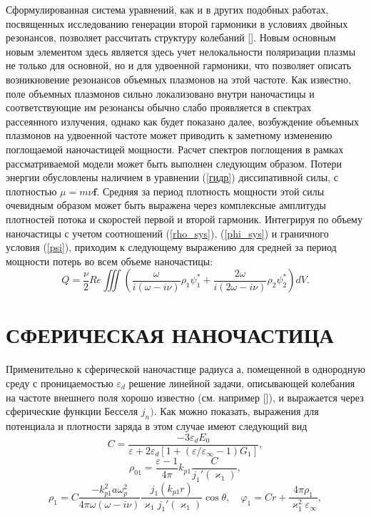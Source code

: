 \documentclass[12pt, a4paper]{article}
\renewcommand{\vec}{\mathbf}
\def \eps {\varepsilon}
\def \w {\omega}
\def \ph {\varphi}
\def \kp { \varkappa}
\begin{document}
Сформулированная система уравнений, как и в других подобных работах, посвященных исследованию генерации второй гармоники в условиях двойных резонансов, позволяет рассчитать структуру колебаний []. Новым основным новым элементом здесь является здесь учет нелокальности поляризации плазмы не только для основной, но и для удвоенной гармоники, что позволяет описать возникновение резонансов объемных плазмонов на этой частоте. Как известно, поле объемных плазмонов сильно локализовано внутри наночастицы и соответствующие им резонансы обычно слабо проявляется в спектрах рассеянного излучения, однако как будет показано далее, возбуждение объемных плазмонов на удвоенной частоте может приводить к заметному изменению поглощаемой наночастицей мощности. Расчет спектров поглощения в рамках рассматриваемой модели может быть выполнен следующим образом. Потери энергии обусловлены наличием в уравнении (\ref{гидр}) диссипативной силы, с плотностью $\mu = m \nu \vec{f}$. Средняя за период плотность мощности этой силы очевидным образом может быть выражена через комплексные амплитуды плотностей потока и скоростей первой и второй гармоник. Интегрируя по объему наночастицы с учетом соотношений (\ref{rho_sys}), (\ref{phi_sys}) и граничного условия (\ref{psi}), приходим к следующему выражению для средней за период мощности потерь во всем объеме наночастицы: 
\begin{equation} 
	\label{Q}
Q = \frac{\nu}{2} Re \iiint (\frac{\w}{i(\w - i \nu)}\rho_1 \psi_1^* + \frac{2\w}{i(2\w - i \nu)}\rho_2 \psi_2^*)dV.
\end{equation}

\section{СФЕРИЧЕСКАЯ НАНОЧАСТИЦА}
Применительно к сферической наночастице радиуса а, помещенной в однородную среду с проницаемостью $\eps_d$ решение линейной задачи, описывающей колебания на частоте внешнего поля хорошо известно (см. например []), и выражается через сферические функции Бесселя $j_n)$. Как можно показать, выражения для потенциала и плотности заряда в этом случае имеют следующий вид
\begin{equation} 
	C= \frac{-3\eps_d E_0}{\eps + 2\eps_d [1 + (\eps/\eps_\infty - 1) G_1 ]},  
\end{equation}
\begin{equation} 
\rho_{01} = \frac{\eps -1}{4\pi}k_{p1}\frac{C}{j_1' (\kp_1)}, 	
\end{equation}
\begin{equation} 
	\rho_1 = C \frac{-k_{p1}^2a\w_p^2}{4\pi\w(\w - i \nu) } \frac{j_1(k_{p1} r)}{\kp_1 j_1' (\kp_1)}\cos\theta, \quad \ph_1 = C r + \frac{4\pi \rho_1 }{\kp_1^2 \eps_\infty},
\end{equation}
\end{document}

